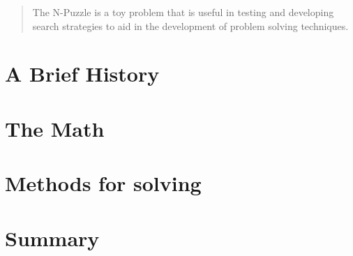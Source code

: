 \documentclass[a4, 12pt]{article}
\begin{document}
\begin{abstract}
The N-Puzzle is a toy problem that is useful in testing and developing search strategies to aid in the development of problem solving techniques.  
\end{abstract}

\section{A Brief History}

\section{The Math}

\section{Methods for solving}

\section{Summary}
\end{document}
